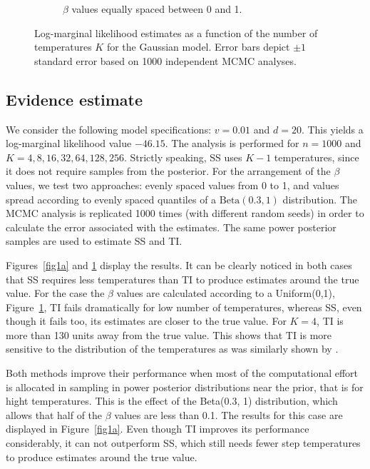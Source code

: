 \documentclass[aps,reprint,amsmath,amssymb,showpacs,showkeys]{revtex4-1}%
\newcommand{\cb}{ \color{blue}}
\begin{document}
\begin{figure}[]
\begin{subfigure}{0.50\textwidth}
		\caption{$\beta$ values equally spaced between 0 and 1.} %
		\label{fig1b}
	\end{subfigure}	
	\caption{Log-marginal likelihood estimates as a function of the number of temperatures $K$ for the Gaussian model.  Error bars depict $\pm1$ standard error based on 1000 independent MCMC analyses.}		
	\label{fig1}
\end{figure}

\subsection{Evidence estimate}

We consider the following model specifications: $v = 0.01$ and $d = 20$.  This yields a log-marginal likelihood value $-46.15$.  The analysis is performed for $n = 1000$ and $K = 4, 8, 16, 32, 64, 128, 256$.  Strictly speaking, SS uses $K-1$ temperatures, since it does not require samples from the posterior.  For the arrangement of the $\beta$ values, we test two approaches: evenly spaced values from 0 to 1, and values spread according to evenly spaced quantiles of a $\text{Beta}(0.3, 1)$ distribution.  The MCMC analysis is replicated 1000 times (with different random seeds) in order to calculate the error associated with the estimates.  The same power posterior samples are used to estimate SS and TI. %

Figures~\ref{fig1a} and \ref{fig1b} display the results. It can be clearly noticed in both cases that SS requires less temperatures than TI to produce estimates around the true value.  For the case the $\beta$ values are calculated according to a Uniform(0,1), Figure~\ref{fig1b}, TI fails dramatically for low number of temperatures, whereas SS, even though it fails too, its estimates are closer to the true value.  For $K=4$, TI is more than 130 units away from the true value.  This shows that TI is more sensitive to the distribution of the temperatures as was similarly shown by \cite{Xie:Lewis:Fan:Kuo:Chen:2011}.

Both methods improve their performance when most of the computational effort is allocated in sampling in power posterior distributions near the prior, that is for hight temperatures.  This is the effect of the Beta(0.3, 1) distribution, which allows that half of the $\beta$ values are less than 0.1.  The results for this case are displayed in Figure~\ref{fig1a}.  Even though TI improves its performance considerably, it can not outperform SS, which still needs fewer step temperatures to produce estimates around the true value. 
\end{document}
